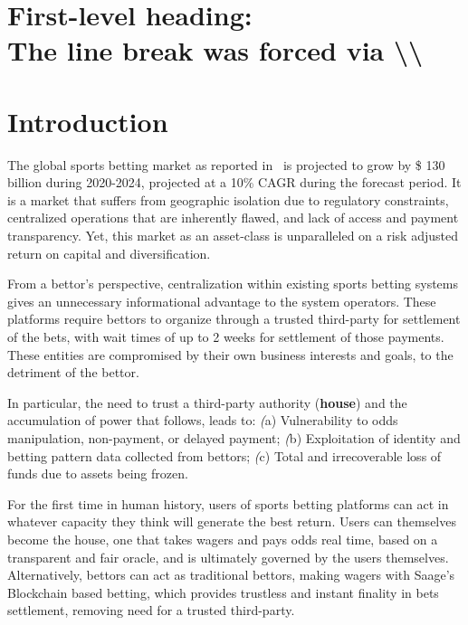 \documentclass[%
 reprint,
 amsmath,amssymb,
 aps,
]{revtex4-2}
\begin{document}
\maketitle

\tableofcontents

\section{\label{sec:level1}First-level heading:\protect\\ The line
break was forced \lowercase{via} \textbackslash\textbackslash}


\section{Introduction}


The global sports betting market as reported in~\cite{SportsBets} is projected to grow by \$ 130 billion during 2020-2024, projected at a 10\% CAGR during the forecast period. It is a market that suffers from geographic isolation due to regulatory constraints, centralized operations that are inherently flawed, and lack of access and payment transparency. Yet, this market as an asset-class is unparalleled on a risk adjusted return on capital and diversification.

From a bettor’s perspective, centralization within existing sports betting systems gives an unnecessary informational advantage to the system operators. These platforms require bettors to organize through a trusted third-party for settlement of the bets, with wait times of up to 2 weeks for settlement of those payments. These entities are compromised by their own business interests and goals, to the detriment of the bettor.

In particular, the need to trust a third-party authority (\textbf{house}) and the accumulation of power that follows, leads to: \textit(a) Vulnerability to odds manipulation, non-payment, or delayed payment; \textit(b) Exploitation of identity and betting pattern data collected from bettors; \textit(c) Total and irrecoverable loss of funds due to assets being frozen.

For the first time in human history, users of sports betting platforms can act in whatever capacity they think will generate the best return.  Users can themselves become the house, one that takes wagers and pays odds real time, based on a transparent and fair oracle, and is ultimately governed by the users themselves.  Alternatively, bettors can act as traditional bettors, making wagers with Saage’s Blockchain based betting, which provides trustless and instant finality in bets settlement, removing need for a trusted third-party. 
\end{document}
